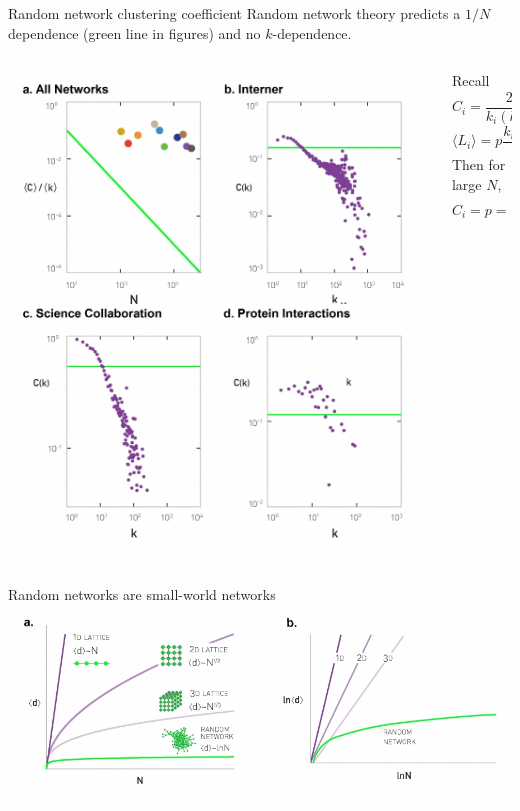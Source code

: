 \documentclass[notes]{beamer}
\begin{document}
\begin{frame}{Random network clustering coefficient}
  Random network theory predicts a $1/N$ dependence (green line in figures)
  and no $k$-dependence.
  \begin{columns}
    \begin{column}{.48\textwidth}
      \includegraphics[width=\textwidth]{Figures/realNetworkClusteringNotRandom.jpg} 
    \end{column}
    \begin{column}{.48\textwidth}
      \small
      Recall \[ C_i = \frac{2 \langle L_i \rangle}{k_i(k_i-1)}, \] 
      \[ \langle L_i \rangle = p \frac{k_i(k_i - 1)}{2}. \]
      Then for large $N$, \[ C_i = p = \frac{\langle k \rangle}{N}. \] 
    \end{column}
  \end{columns}
\end{frame}

\begin{frame}{Random networks are small-world networks}
  \centering
  \includegraphics[width=1.1\textwidth]{Figures/randomSmallWorld.jpg} 
\end{frame}
\end{document}
